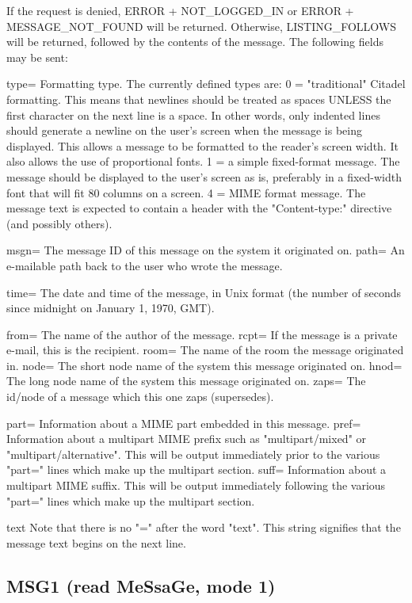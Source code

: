  If the request is denied, ERROR + NOT_LOGGED_IN or ERROR + MESSAGE_NOT_FOUND
will be returned.  Otherwise, LISTING_FOLLOWS will be returned, followed by
the contents of the message.  The following fields may be sent:

 type=   Formatting type.  The currently defined types are:
  0 = "traditional" Citadel formatting.  This means that newlines should be
treated as spaces UNLESS the first character on the next line is a space.  In
other words, only indented lines should generate a newline on the user's screen
when the message is being displayed.  This allows a message to be formatted to
the reader's screen width.  It also allows the use of proportional fonts.
  1 = a simple fixed-format message.  The message should be displayed to
the user's screen as is, preferably in a fixed-width font that will fit 80
columns on a screen.
  4 = MIME format message.  The message text is expected to contain a header
with the "Content-type:" directive (and possibly others).

 msgn=   The message ID of this message on the system it originated on.
 path=   An e-mailable path back to the user who wrote the message.

 time=   The date and time of the message, in Unix format (the number of
seconds since midnight on January 1, 1970, GMT).

 from=   The name of the author of the message.
 rcpt=   If the message is a private e-mail, this is the recipient.
 room=   The name of the room the message originated in.
 node=   The short node name of the system this message originated on.
 hnod=   The long node name of the system this message originated on.
 zaps=   The id/node of a message which this one zaps (supersedes).

 part=   Information about a MIME part embedded in this message.
 pref=   Information about a multipart MIME prefix such as "multipart/mixed"
         or "multipart/alternative".  This will be output immediately prior
         to the various "part=" lines which make up the multipart section.
 suff=   Information about a multipart MIME suffix.  This will be output
         immediately following the various "part=" lines which make up the
         multipart section.

 text    Note that there is no "=" after the word "text".  This string
signifies that the message text begins on the next line.



\subsection{MSG1 (read MeSsaGe, mode 1)}

